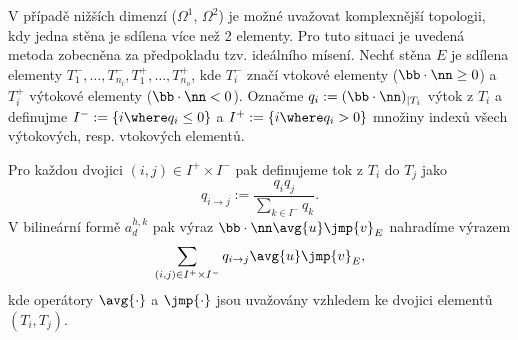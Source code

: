 V případě nižších dimenzí ($\Omega^1$, $\Omega^2$) je možné uvažovat komplexnější topologii, kdy jedna stěna je sdílena více než 2 elementy.
Pro tuto situaci je uvedená metoda zobecněna za předpokladu tzv. ideálního mísení.
Nechť stěna $E$ je sdílena elementy $T_1^-,\ldots,T_{n_i}^-,T_1^+,\ldots,T_{n_o}^+$, kde $T_i^-$ značí vtokové elementy ($\bb\cdot\nn\ge0$) a $T_i^+$ výtokové elementy ($\bb\cdot\nn<0$).
Označme $q_i:=(\bb\cdot\nn)_{|T_i}$ výtok z $T_i$ a definujme $I^-:=\{i\where q_i\le 0\}$ a $I^+:=\{i\where q_i>0\}$ množiny indexů všech výtokových, resp. vtokových elementů.

Pro každou dvojici $(i,j)\in I^+\times I^-$ pak definujeme tok z $T_i$ do $T_j$ jako
$$ q_{i\to j} := \frac{q_i q_j}{\sum_{k\in I^-}{q_k}}. $$
V bilineární formě $a_d^{h,k}$ pak výraz $\sc{\bb\cdot\nn\avg{u}}{\jmp{v}}_E$ nahradíme výrazem
$$ \sum_{(i,j)\in I^+\times I^-}\sc{q_{i\to j}\avg{u}}{\jmp{v}}_E, $$
kde operátory $\avg{\cdot}$ a $\jmp{\cdot}$ jsou uvažovány vzhledem ke dvojici elementů $(T_i,T_j)$.

